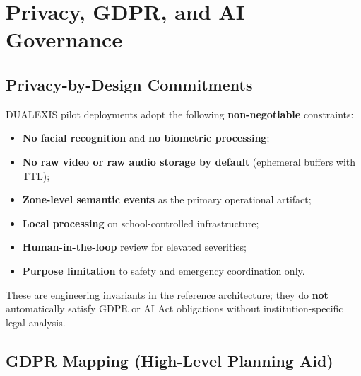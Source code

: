 \section{Privacy, GDPR, and AI Governance}
\label{sec:privacy-gdpr}

\subsection{Privacy-by-Design Commitments}

DUALEXIS pilot deployments adopt the following \textbf{non-negotiable} constraints:

\begin{itemize}[noitemsep]
  \item \textbf{No facial recognition} and \textbf{no biometric processing};
  \item \textbf{No raw video or raw audio storage by default} (ephemeral buffers with TTL);
  \item \textbf{Zone-level semantic events} as the primary operational artifact;
  \item \textbf{Local processing} on school-controlled infrastructure;
  \item \textbf{Human-in-the-loop} review for elevated severities;
  \item \textbf{Purpose limitation} to safety and emergency coordination only.
\end{itemize}

These are engineering invariants in the reference architecture; they do \textbf{not}
automatically satisfy GDPR or AI Act obligations without institution-specific legal analysis.

\subsection{GDPR Mapping (High-Level Planning Aid)}

